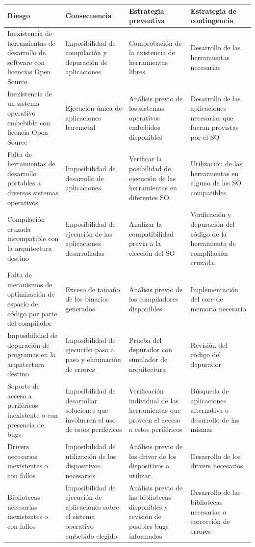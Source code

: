 		\begin{table}[!h]
		\centering
		\begin{tabular}{ p{4cm} p{4cm} p{4cm} p{3cm} }
		\hline 
		\rowcolor[gray]{0.8} Riesgo & Consecuencia & Estrategia preventiva & Estrategia de contingencia\\
		\hline
		Inexistencia de herramientas de desarrollo de software con licencias Open Source & Imposibilidad de compilación y depuración de aplicaciones &Comprobación de la existencia de herramientas libres & Desarrollo de las herramientas necesarias\\
		\hline
		Inexistencia de un sistema operativo embebible con licencia Open Source  & Ejecución única de aplicaciones baremetal  & Análisis previo de los sistemas operativos embebidos disponibles & Desarrollo de las aplicaciones necesarias que fueran provistas por el SO\\
		\hline		
		 Falta de herramientas de desarrollo portables a diversos sistemas operativos & Imposibilidad de desarrollo de aplicaciones& Verificar la posibilidad de ejecución de las herramientas en diferentes SO& Utilización de las herramientas en alguno de los SO compatibles\\
		\hline		
		 Compilación cruzada incompatible con la arquitectura destino& Imposibilidad de ejecución de las aplicaciones desarrolladas & Analizar la compatibilidad previa a la elección del SO &  Verificación y depuración del código de la herramienta de complilación cruzada. \\
		\hline
		Falta de mecanismos de optimización de espacio de código por parte del  compilador&Exceso de tamaño de los binarios generados & Análisis previo de los compiladores disponibles & Implementación del core de memoria necesario\\
		\hline
		Imposibilidad de depuración de programas en la arquitectura destino& Imposibilidad de ejecución paso a paso y eliminación de errores &Prueba del depurador con simulador de arquitectura & Revisión del código del depurador \\
		\hline
		Soporte de acceso a periféricos inexistente o con presencia de bugs & Imposibilidad de desarrollar soluciones que involucren el uso de estos periféricos & Verificación individual de las herramientas que proveen el acceso a estos periféricos & Búsqueda  de  aplicaciones alternativa o desarrollo de las mismas\\
		\hline
		 Drivers necesarios inexistentes o con fallos & Imposibilidad de utilización de los dispositivos necesarios&Análisis previo de los driver de los dispositivos a utilizar &  Desarrollo de los drivers necesarios\\
		\hline
		Bibliotecas necesarias inexistentes o con fallos& Imposibilidad de ejecución de aplicaciones sobre el sistema operativo embebido elegido & Análisis previo de las bibliotecas disponibles y revisión de posibles bugs informados &  Desarrollo de las bibliotecas necesarias o corrección de errores\\
		\hline
		\end{tabular}
		\end{table}
